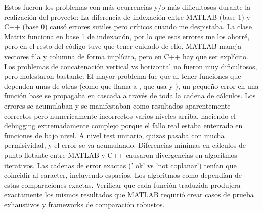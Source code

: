 \markdownRendererDocumentBegin
\markdownRendererSectionBegin
{}\markdownRendererInterblockSeparator
{}Estos fueron los problemas con más ocurrencias y/o más dificultosos durante la realización del proyecto:\markdownRendererInterblockSeparator
{}\markdownRendererSectionBegin
{}\markdownRendererInterblockSeparator
{}La diferencia de indexación entre MATLAB (base 1) y C++ (base 0) causó errores sutiles pero críticos cuando me despistaba. La clase Matrix funciona en base 1 de indexación, por lo que esos errores me los ahorré, pero en el resto del código tuve que tener cuidado de ello.\markdownRendererInterblockSeparator
{}
\markdownRendererSectionEnd \markdownRendererSectionBegin
{}\markdownRendererInterblockSeparator
{}MATLAB maneja vectores fila y columna de forma implícita, pero en C++ hay que ser explícito. Los problemas de concatenación vertical vs horizontal no fueron muy dificultosos, pero molestaron bastante.\markdownRendererInterblockSeparator
{}
\markdownRendererSectionEnd \markdownRendererSectionBegin
{}\markdownRendererInterblockSeparator
{}El mayor problema fue que al tener funciones que dependen unas de otras (como  que llama a , que usa  y ), un pequeño error en una función base se propagaba en cascada a través de toda la cadena de cálculos. Los errores se acumulaban y se manifestaban como resultados aparentemente correctos pero numericamente incorrectos varios niveles arriba, haciendo el debugging extremadamente complejo porque el fallo real estaba enterrado en funciones de bajo nivel. A nivel test unitario, quizas pasaba con mucha permisividad, y el error se va acumulando.\markdownRendererInterblockSeparator
{}
\markdownRendererSectionEnd \markdownRendererSectionBegin
{}\markdownRendererInterblockSeparator
{}Diferencias mínimas en cálculos de punto flotante entre MATLAB y C++ causaron divergencias en algoritmos iterativos.\markdownRendererInterblockSeparator
{}
\markdownRendererSectionEnd \markdownRendererSectionBegin
{}\markdownRendererInterblockSeparator
{}Las cadenas de error exactas (' ok' vs 'not coplanar') tenían que coincidir al caracter, incluyendo espacios. Los algoritmos como  dependían de estas comparaciones exactas.\markdownRendererInterblockSeparator
{}
\markdownRendererSectionEnd \markdownRendererSectionBegin
{}\markdownRendererInterblockSeparator
{}Verificar que cada función traduzida produjera exactamente los mismos resultados que MATLAB requirió crear casos de prueba exhaustivos y frameworks de comparación robustos.
\markdownRendererSectionEnd 
\markdownRendererSectionEnd \markdownRendererDocumentEnd
